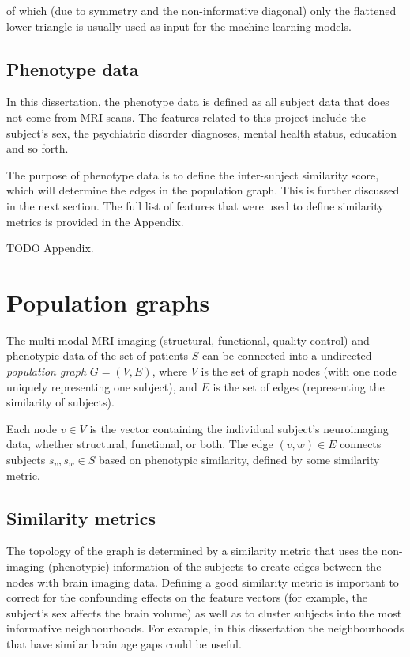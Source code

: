 of which (due to symmetry and the non-informative diagonal) only the flattened lower triangle is usually used as input for the machine learning models.

\subsection{Phenotype data}

In this dissertation, the phenotype data is defined as all subject data that does not come from MRI scans. The features related to this project include the subject's sex, the psychiatric disorder diagnoses, mental health status, education and so forth.

The purpose of phenotype data is to define the inter-subject similarity score, which will determine the edges in the population graph. This is further discussed in the next section. The full list of features that were used to define similarity metrics is provided in the Appendix.

TODO Appendix.

\section{Population graphs}
\label{population-graphs}

The multi-modal MRI imaging (structural, functional, quality control) and phenotypic data of the set of patients $S$ can be connected into a undirected \textit{population graph} $G = (V, E)$, where $V$ is the set of graph nodes (with one node uniquely representing one subject), and $E$ is the set of edges (representing the similarity of subjects).

Each node $v \in V$ is the vector containing the individual subject's neuroimaging data, whether structural, functional, or both. The edge $(v, w) \in E$ connects subjects $s_v, s_w \in S$ based on phenotypic similarity, defined by some similarity metric.

\subsection{Similarity metrics}
The topology of the graph is determined by a similarity metric that uses the non-imaging (phenotypic) information of the subjects to create edges between the nodes with brain imaging data. Defining a good similarity metric is important to correct for the confounding effects on the feature vectors (for example, the subject's sex affects the brain volume) as well as to cluster subjects into the most informative neighbourhoods. For example, in this dissertation the neighbourhoods that have similar brain age gaps could be useful.

